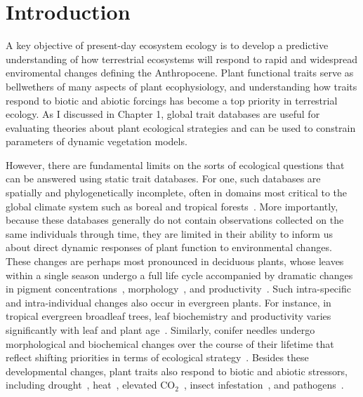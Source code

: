 \section{Introduction}

A key objective of present-day ecosystem ecology is to develop a predictive understanding of how terrestrial ecosystems will respond to rapid and widespread enviromental changes defining the Anthropocene. 
Plant functional traits serve as bellwethers of many aspects of plant ecophysiology, and understanding how traits respond to biotic and abiotic forcings has become a top priority in terrestrial ecology.
As I discussed in Chapter 1, global trait databases are useful for evaluating theories about plant ecological strategies and can be used to constrain parameters of dynamic vegetation models.

However, there are fundamental limits on the sorts of ecological questions that can be answered using static trait databases.
For one, such databases are spatially and phylogenetically incomplete, often in domains most critical to the global climate system such as boreal and tropical forests~\cite{jetz2016_diversity}.
More importantly, because these databases generally do not contain observations collected on the same individuals through time, they are limited in their ability to inform us about direct dynamic responses of plant function to environmental changes.
These changes are perhaps most pronounced in deciduous plants, whose leaves within a single season undergo a full life cycle accompanied by dramatic changes in pigment concentrations~\cite{yang_2016_seasonal}, morphology~\cite{poorter_causes_2009}, and productivity~\cite{parent_2010_modelling}.
Such intra-specific and intra-individual changes also occur in evergreen plants.
For instance, in tropical evergreen broadleaf trees, leaf biochemistry and productivity varies significantly with leaf and plant age~\cite{kitajima_1997_decline,Kitajima_2013_leaf,chavana_bryant_2016_leaf,wu_leaf_2016}.
Similarly, conifer needles undergo morphological and biochemical changes over the course of their lifetime that reflect shifting priorities in terms of ecological strategy~\cite{kuusk_2017_major}.
Besides these developmental changes, plant traits also respond to biotic and abiotic stressors, including
drought~\cite{sun_2018_reflectance,buchner_2017_drought,bayat_2016_remote},
heat~\cite{chapin_1996_physiological,serbin_2012_spectroscopic},
elevated CO$_2$~\cite{medlyn_using_2015,lindroth_2010_impacts},
insect infestation~\cite{divittorio_2009_spectral,marti_2012_metabolomics},
and pathogens~\cite{horst_2009_ustilago}.

